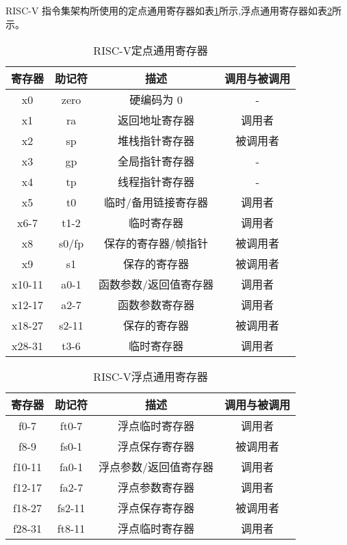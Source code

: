 RISC-V 指令集架构所使用的定点通用寄存器如表\ref{tab:xpr}所示,浮点通用寄存器如表\ref{tab:fpr}所示。
\begin{table}[H]
  \centering
  \caption{RISC-V定点通用寄存器}
  \label{tab:xpr}
  \begin{tabular}{cccc}
    \toprule
寄存器 &	助记符	& 描述 &	调用与被调用\\
    \midrule
    x0 & zero & 硬编码为 0 & -\\
    x1 & ra & 返回地址寄存器 & 调用者\\
    x2 & sp & 堆栈指针寄存器 & 被调用者\\
    x3 & gp & 全局指针寄存器 & -\\
    x4 & tp & 线程指针寄存器 & -\\
    x5 & t0 & 临时/备用链接寄存器 & 调用者\\
    x6-7 & t1-2 & 临时寄存器 & 调用者\\
    x8 & s0/fp & 保存的寄存器/帧指针 & 被调用者\\
    x9 & s1 & 保存的寄存器 & 被调用者\\
    x10-11 & a0-1 & 函数参数/返回值寄存器 & 调用者\\
    x12-17 & a2-7 & 函数参数寄存器 & 调用者\\
    x18-27 & s2-11 & 保存的寄存器 & 被调用者\\
    x28-31	& t3-6 & 临时寄存器 & 调用者\\
    \bottomrule
  \end{tabular}
\end{table}


\begin{table}[h]
  \centering
  \caption{RISC-V浮点通用寄存器}
  \label{tab:fpr}
  \begin{tabular}{cccc}
    \toprule
寄存器 &	助记符	& 描述 &	调用与被调用\\
    \midrule
    f0-7 & ft0-7 & 浮点临时寄存器 & 调用者\\
    f8-9 & fs0-1 & 浮点保存寄存器 & 被调用者\\
    f10-11 & fa0-1 & 浮点参数/返回值寄存器 & 调用者\\
    f12-17 & fa2-7 & 浮点参数寄存器 & 调用者\\
    f18-27 & fs2-11 & 浮点保存寄存器 & 被调用者\\
    f28-31 & ft8-11 & 浮点临时寄存器 & 调用者\\
    \bottomrule
  \end{tabular}
\end{table}


